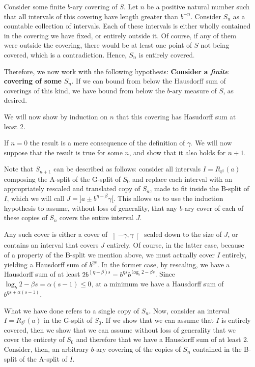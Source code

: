 \documentclass[11pt, reqno]{amsart}
\begin{document}
Consider some finite $b$-ary covering of $S$. Let $n$ be a positive natural number such that all intervals of this covering have length greater than $b^{-n}$. Consider $S_n$ as a countable collection of intervals. Each of these intervals is either wholly contained in the covering we have fixed, or entirely outside it. Of course, if any of them were outside the covering, there would be at least one point of $S$ not being covered, which is a contradiction. Hence, $S_n$ is entirely covered.

Therefore, we now work with the following hypothesis: \textbf{Consider a \emph{finite} covering of some $S_n$}. If we can bound from below the Hausdorff sum of coverings of this kind, we have bound from below the $b$-ary measure of $S$, as desired.

We will now show by induction on $n$ that this covering has Hasudorff sum at least 2.

If $n = 0$ the result is a mere consequence of the definition of $\gamma$. We will now suppose that the result is true for some $n$, and show that it also holds for $n+1$.

Note that $S_{n+1}$ can be described as follows: consider all intervals $I = R_{b^\eta}(a)$ composing the A-split of the G-split of $S_0$ and replace each interval with an appropriately rescaled and translated copy of $S_n$, made to fit inside the B-split of $I$, which we will call $J = ]a \pm b^{\eta - \beta} \gamma[$. This allows us to use the induction hypothesis to assume, without loss of generality, that any $b$-ary cover of each of these copies of $S_n$ covers the entire interval $J$.

Any such cover is either a cover of $\left]-\gamma, \gamma \right[$ scaled down to the size of $J$, or contains an interval that covers $J$ entirely. Of course, in the latter case, because of a property of the B-split we mention above, we must actually cover $I$ entirely, yielding a Hausdorff sum of $b^{\eta s}$. In the former case, by rescaling, we have a Hausdorff sum of at least $2 b^{(\eta - \beta) s} = b^{\eta s} b^{\log_b 2 - \beta s}$. Since $\log_b 2 - \beta s = \alpha (s - 1) \leq 0$, at a minimum we have a Hausdorff sum of $b^{\eta s + \alpha (s - 1)}$.

What we have done refers to a single copy of $S_n$. Now, consider an interval $I = R_{b^\eta}(a)$ in the G-split of $S_0$. If we show that we can assume that $I$ is entirely covered, then we show that we can assume without loss of generality that we cover the entirety of $S_0$ and therefore that we have a Hausdorff sum of at least 2. Consider, then, an arbitrary $b$-ary covering of the copies of $S_n$ contained in the B-split of the A-split of $I$.
\end{document}
